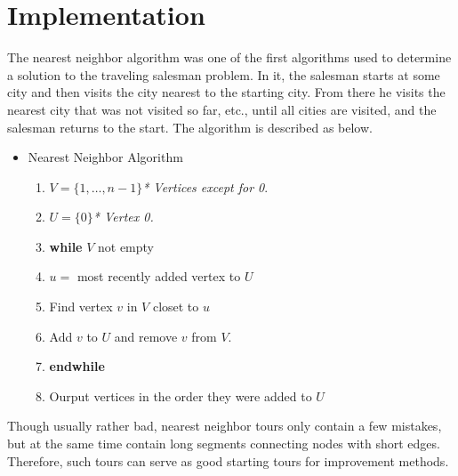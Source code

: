 \documentclass[11pt]{article}
\def\vy{\mathbf{y}}
\begin{document}







\section{Implementation}
The nearest neighbor algorithm was one of the first algorithms used to determine a solution to the traveling salesman problem. In it, the salesman starts at some city and then visits the city nearest to the starting city. From there he visits the nearest city that was not visited so far, etc., until all cities are visited, and the salesman returns to the start. The algorithm is described as below.
\begin{itemize}
  \item Nearest Neighbor Algorithm
\begin{enumerate}
  \item $V=\{1,\ldots,n-1\}$\quad\emph{* Vertices except for 0}.
  \item $U=\{0\}$\quad\quad\quad\quad\quad\quad\emph{* Vertex 0.}
  \item \textbf{while} $V$ not empty
  \item \quad $u=$ most recently added vertex to $U$
  \item \quad Find vertex $v$ in $V$ closet to $u$
  \item \quad Add $v$ to $U$ and remove $v$ from $V.$
  \item \textbf{endwhile}
  \item Ourput vertices in the order they were added to $U$
\end{enumerate}
\end{itemize}
Though usually rather bad, nearest neighbor tours only contain a few mistakes, but at the same time contain long segments connecting nodes with short edges. Therefore, such tours can serve as good starting tours for improvement methods.
\end{document}
